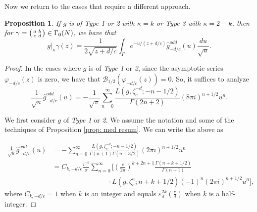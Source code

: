 \documentclass[12pt]{amsart}
\theoremstyle{definition}
\theoremstyle{plain}
\newtheorem{prop}[theorem]{Proposition}
\numberwithin{equation}{section}
\begin{document}
Now we return to the cases that require a different approach. 
\begin{prop} \label{prop: modular slash}
If $g$ is of Type 1 or 2 with $\kappa = k$ or Type 3 with $\kappa = 2-k$, then for $\gamma = \begin{psmallmatrix} a & b \\ c & d \end{psmallmatrix} \in \Gamma_0(N)$, we have that 
\[g|_{\kappa}\gamma(z) = \frac{1}{2\sqrt{z+d/c}} \int_{\Gamma}e^{-u/(z+d/c)}\hat{g}_{-d/c}^{odd}(u)\frac{du}{\sqrt{u}}.\]
\end{prop}

\begin{proof}	
In the cases where $g$ is of \emph{Type 1} or \emph{2}, since the asymptotic series $\varphi_{-d/c}(z)$ is zero, we have that $\mathcal{B}_{1/2}(\varphi_{-d/c}(z))=0$. So, it suffices to analyze 
 \[\frac{1}{\sqrt{u}}\widehat{g}_{-d/c}^{odd}(u) = -\frac{1}{\sqrt{\pi }} \sum_{n=0}^\infty \frac{ L(g, \zeta_c^{-d};-n-1/2)}{\Gamma(2n+2)}(8\pi i)^{n+1/2}u^{n}.
\]
 
We first consider $g$ of \emph{Type 1} or \emph{2}. We assume the notation and some of the techniques of Proposition \ref{prop: med resum}. 
We can write the above as 

 \begin{align*}\frac{1}{\sqrt{u}}\widehat{g}_{-d/c}^{odd}(u) &= - \sum_{n=0}^\infty \frac{ L(g, \zeta_c^{-d};-n-1/2)}{\Gamma(n+1)\Gamma(n+3/2)}(2\pi i)^{n+1/2}u^{n}\\
 &=C_{k, -d/c} \frac{i^{-k}}{\pi} \sum_{n=0}^\infty \Big\lbrack \left(\frac{c}{2\pi}\right)^{k+2n+1}\frac{\Gamma(n+k+1/2)}{\Gamma(n+1)}\\ & \quad \quad \quad \quad\quad \quad\quad \quad\cdot L(g, \zeta_c^{a}; n+k+1/2) (-1)^n(2\pi i)^{n+1/2}u^n\Big\rbrack,
\end{align*}
where $C_{k, -d/c}=1$ when $k$ is an integer and equals $\varepsilon_d^{2k}\left(\frac{c}{d}\right)$ when $k$ is a half-integer. 



\end{proof}
\end{document}
